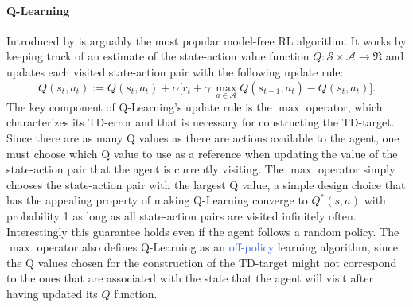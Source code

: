 \paragraph{\textbf{\uppercase{Q}-\uppercase{L}earning}} Introduced by \citet{watkins1992q} is arguably the most popular model-free RL algorithm. It works by keeping track of an estimate of the state-action value function $Q: \mathcal{S} \times \mathcal{A} \rightarrow \Re$ and updates each visited state-action pair with the following update rule:
\begin{equation}
Q(s_t,a_t):=Q(s_t,a_t) + \alpha\big[r_t + \gamma \:\underset{a\in \mathcal{A}}{\max} Q(s_{t+1},a_t) - Q(s_t, a_t) \big].
\label{eq:q_learning}
\end{equation}
The key component of Q-Learning's update rule is the $\max$ operator, which characterizes its TD-error and that is necessary for constructing the TD-target. Since there are as many Q values as there are actions available to the agent, one must choose which Q value to use as a reference when updating the value of the state-action pair that the agent is currently visiting. The $\max$ operator simply chooses the state-action pair with the largest Q value, a simple design choice that has the appealing property of making Q-Learning converge to $Q^{*}(s, a)$ with probability 1 as long as all state-action pairs are visited infinitely often. Interestingly this guarantee holds even if the agent follows a random policy. The $\max$ operator also defines Q-Learning as an \textcolor{RoyalBlue}{off-policy} learning algorithm, since the Q values chosen for the construction of the TD-target might not correspond to the ones that are associated with the state that the agent will visit after having updated its $Q$ function.

